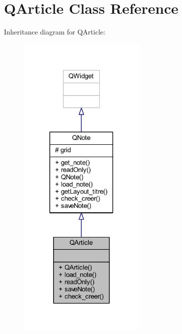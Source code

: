 \hypertarget{class_q_article}{}\section{Q\+Article Class Reference}
\label{class_q_article}


Inheritance diagram for Q\+Article\+:\nopagebreak
\begin{figure}[H]
\begin{center}
\leavevmode
\includegraphics[width=176pt]{class_q_article__inherit__graph}
\end{center}
\end{figure}


